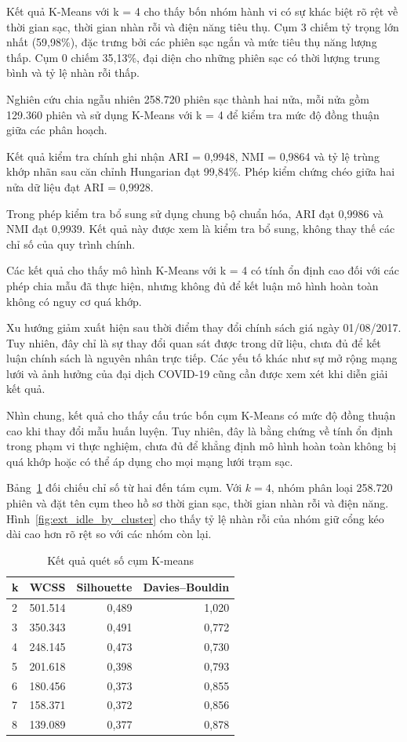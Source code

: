 \documentclass[conference,a4paper]{IEEEtran}
\begin{document}
Kết quả K-Means với k = 4 cho thấy bốn nhóm hành vi có sự khác biệt rõ rệt về thời gian sạc, thời gian nhàn rỗi và điện năng tiêu thụ. Cụm 3 chiếm tỷ trọng lớn nhất (59,98\%), đặc trưng bởi các phiên sạc ngắn và mức tiêu thụ năng lượng thấp. Cụm 0 chiếm 35,13\%, đại diện cho những phiên sạc có thời lượng trung bình và tỷ lệ nhàn rỗi thấp.

Nghiên cứu chia ngẫu nhiên 258.720 phiên sạc thành hai nửa, mỗi nửa gồm 129.360 phiên và sử dụng K-Means với k = 4 để kiểm tra mức độ đồng thuận giữa các phân hoạch.

Kết quả kiểm tra chính ghi nhận ARI = 0,9948, NMI = 0,9864 và tỷ lệ trùng khớp nhãn sau căn chỉnh Hungarian đạt 99,84\%. Phép kiểm chứng chéo giữa hai nửa dữ liệu đạt ARI = 0,9928.

Trong phép kiểm tra bổ sung sử dụng chung bộ chuẩn hóa, ARI đạt 0,9986 và NMI đạt 0,9939. Kết quả này được xem là kiểm tra bổ sung, không thay thế các chỉ số của quy trình chính.

Các kết quả cho thấy mô hình K-Means với k = 4 có tính ổn định cao đối với các phép chia mẫu đã thực hiện, nhưng không đủ để kết luận mô hình hoàn toàn không có nguy cơ quá khớp.

Xu hướng giảm xuất hiện sau thời điểm thay đổi chính sách giá ngày 01/08/2017. Tuy nhiên, đây chỉ là sự thay đổi quan sát được trong dữ liệu, chưa đủ để kết luận chính sách là nguyên nhân trực tiếp. Các yếu tố khác như sự mở rộng mạng lưới và ảnh hưởng của đại dịch COVID-19 cũng cần được xem xét khi diễn giải kết quả.

Nhìn chung, kết quả cho thấy cấu trúc bốn cụm K-Means có mức độ đồng thuận cao khi thay đổi mẫu huấn luyện. Tuy nhiên, đây là bằng chứng về tính ổn định trong phạm vi thực nghiệm, chưa đủ để khẳng định mô hình hoàn toàn không bị quá khớp hoặc có thể áp dụng cho mọi mạng lưới trạm sạc.

Bảng~\ref{tab:k_grid} đối chiếu chỉ số từ hai đến tám cụm. Với $k=4$, nhóm phân loại 258.720 phiên và đặt tên cụm theo hồ sơ thời gian sạc, thời gian nhàn rỗi và điện năng. Hình~\ref{fig:ext_idle_by_cluster} cho thấy tỷ lệ nhàn rỗi của nhóm giữ cổng kéo dài cao hơn rõ rệt so với các nhóm còn lại.

\begin{table}[!t]
\caption{Kết quả quét số cụm K-means}
\label{tab:k_grid}
\centering\footnotesize
\setlength{\tabcolsep}{3pt}
\begin{tabularx}{\columnwidth}{@{}Xrrr@{}}
\toprule
\textbf{k} & \textbf{WCSS} & \textbf{Silhouette} & \textbf{Davies–Bouldin} \\
\midrule
2 & 501.514 & 0,489 & 1,020 \\
3 & 350.343 & 0,491 & 0,772 \\
4 & 248.145 & 0,473 & 0,730 \\
5 & 201.618 & 0,398 & 0,793 \\
6 & 180.456 & 0,373 & 0,855 \\
7 & 158.371 & 0,372 & 0,856 \\
8 & 139.089 & 0,377 & 0,878 \\
\bottomrule
\end{tabularx}
\end{table}
\end{document}
